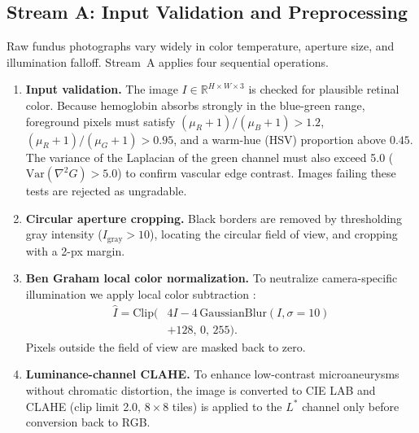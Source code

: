 \documentclass[conference]{IEEEtran}
\newcommand{\Ihat}{\hat{I}}
\begin{document}
\subsection{Stream A: Input Validation and Preprocessing}
Raw fundus photographs vary widely in color temperature, aperture size, and illumination falloff. Stream~A applies four sequential operations.
\begin{enumerate}
\item \textbf{Input validation.} The image $I\in\mathbb{R}^{H\times W\times 3}$ is checked for plausible retinal color. Because hemoglobin absorbs strongly in the blue-green range, foreground pixels must satisfy $(\mu_R{+}1)/(\mu_B{+}1)>1.2$, $(\mu_R{+}1)/(\mu_G{+}1)>0.95$, and a warm-hue (HSV) proportion above $0.45$. The variance of the Laplacian of the green channel must also exceed 5.0 ($\mathrm{Var}(\nabla^2 G)>5.0$) to confirm vascular edge contrast. Images failing these tests are rejected as ungradable.
\item \textbf{Circular aperture cropping.} Black borders are removed by thresholding gray intensity ($I_{\mathrm{gray}}>10$), locating the circular field of view, and cropping with a 2-px margin.
\item \textbf{Ben Graham local color normalization.} To neutralize camera-specific illumination we apply local color subtraction \cite{graham2015}:
\begin{equation}
\begin{split}
\Ihat=\mathrm{Clip}\big(&4I-4\,\mathrm{GaussianBlur}(I,\sigma{=}10)\\
&+128,\,0,\,255\big).
\end{split}
\label{eq:graham}
\end{equation}
Pixels outside the field of view are masked back to zero.
\item \textbf{Luminance-channel CLAHE.} To enhance low-contrast microaneurysms without chromatic distortion, the image is converted to CIE LAB and CLAHE (clip limit 2.0, $8{\times}8$ tiles) is applied to the $L^*$ channel only before conversion back to RGB.
\end{enumerate}
\end{document}
